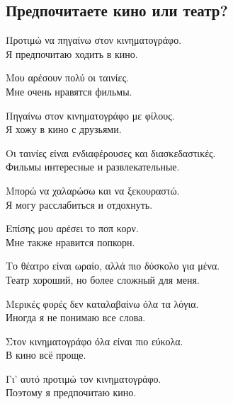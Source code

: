 \documentclass[12pt]{article}
\newcommand{\my}[1]{\textcolor{gray!80!white}{#1}}
\newenvironment{page}{\clearpage\normalsize\null\vfill}{\vfill\null}
\newenvironment{textblock}{\begin{minipage}{\textwidth}}{\end{minipage}\smallskip}
\begin{document}
	\begin{page}
		\subsection{Предпочитаете кино или театр?}
		\small
		\begin{textblock}
			Προτιμώ να πηγαίνω στον κινηματογράφο.\\
			\my{Я предпочитаю ходить в кино.}
			
			Μου αρέσουν πολύ οι ταινίες.\\
			\my{Мне очень нравятся фильмы.}
			
			Πηγαίνω στον κινηματογράφο με φίλους.\\
			\my{Я хожу в кино с друзьями.}
			
			Οι ταινίες είναι ενδιαφέρουσες και διασκεδαστικές.\\
			\my{Фильмы интересные и развлекательные.}
			
			Μπορώ να χαλαρώσω και να ξεκουραστώ.\\
			\my{Я могу расслабиться и отдохнуть.}
			
			Επίσης μου αρέσει το ποπ κορν.\\
			\my{Мне также нравится попкорн.}
			
			Το θέατρο είναι ωραίο, αλλά πιο δύσκολο για μένα.\\
			\my{Театр хороший, но более сложный для меня.}
			
			Μερικές φορές δεν καταλαβαίνω όλα τα λόγια.\\
			\my{Иногда я не понимаю все слова.}
			
			Στον κινηματογράφο όλα είναι πιο εύκολα.\\
			\my{В кино всё проще.}
			
			Γι’ αυτό προτιμώ τον κινηματογράφο.\\
			\my{Поэтому я предпочитаю кино.}
		\end{textblock}
	\end{page}
	
\end{document}
